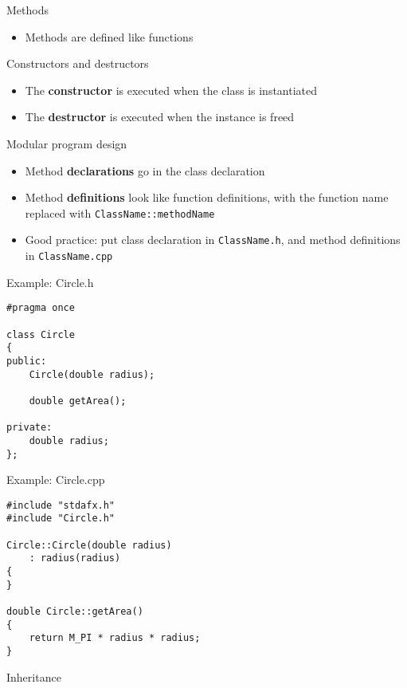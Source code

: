 \begin{frame}[fragile]{Methods}
    \begin{itemize}
        \item Methods are defined like functions
    \end{itemize}
\end{frame}

\begin{frame}[fragile]{Constructors and destructors}
    \begin{itemize}
        \item The \textbf{constructor} is executed when the class is instantiated
        \item The \textbf{destructor} is executed when the instance is freed
    \end{itemize}
\end{frame}

\begin{frame}[fragile]{Modular program design}
    \begin{itemize}
        \item Method \textbf{declarations} go in the class declaration
        \item Method \textbf{definitions} look like function definitions, with the function name replaced with \lstinline{ClassName::methodName}
        \item Good practice: put class declaration in \texttt{ClassName.h}, and method definitions in \texttt{ClassName.cpp}
    \end{itemize}
\end{frame}

\begin{frame}[fragile]{Example: Circle.h}
    \begin{lstlisting}
#pragma once

class Circle
{
public:
    Circle(double radius);
    
    double getArea();

private:
    double radius;
};
    \end{lstlisting}
\end{frame}

\begin{frame}[fragile]{Example: Circle.cpp}
    \begin{lstlisting}
#include "stdafx.h"
#include "Circle.h"

Circle::Circle(double radius)
    : radius(radius)
{
}

double Circle::getArea()
{
    return M_PI * radius * radius;
}
    \end{lstlisting}
\end{frame}

\begin{frame}[fragile]{Inheritance}
\end{frame}
